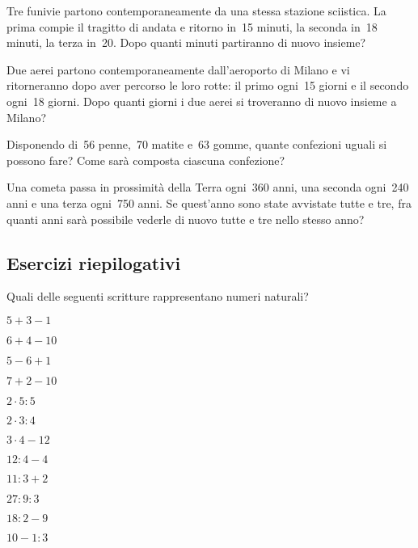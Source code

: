 \begin{htmulticols}{2}
\begin{esercizio}
Tre funivie partono contemporaneamente da una stessa stazione sciistica. La 
prima compie il tragitto di andata e ritorno in~15 minuti, la seconda in~18 
minuti, la terza in~20. 
Dopo quanti minuti partiranno di nuovo insieme? 
\end{esercizio}

\begin{esercizio}
Due aerei partono contemporaneamente dall'aeroporto di Milano e vi 
ritorneranno dopo aver percorso le loro rotte: il primo ogni~15 giorni e il 
secondo ogni~18 giorni. 
Dopo quanti giorni i due aerei si troveranno di nuovo insieme a Milano? 
\end{esercizio}

\begin{esercizio}
Disponendo di~56 penne,~70 matite e~63 gomme, quante confezioni uguali si 
possono fare? Come sarà composta ciascuna confezione? 
\end{esercizio}

\begin{esercizio}
Una cometa passa in prossimità della Terra ogni~360 anni, una seconda 
ogni~240 anni e una terza ogni~750 anni.
Se quest'anno sono state avvistate tutte e tre, fra quanti anni sarà 
possibile vederle di nuovo tutte e tre nello stesso anno? 
\end{esercizio}
\end{htmulticols}


\subsection{Esercizi riepilogativi}
\begin{esercizio}
Quali delle seguenti scritture rappresentano numeri naturali?
 \begin{htmulticols}{4}
 \begin{enumeratees}
 \item \(5+3-1\)
 \item \(6+4-10\)
 \item \(5-6+1\)
 \item \(7+2-10\)
 \item \(2\cdot5:5\)
 \item \(2\cdot3:4\)
 \item \(3\cdot4-12\)
 \item \(12:4-4\)
 \item \(11:3+2\)
 \item \(27:9:3\)
 \item \(18:2-9\)
 \item \(10-1:3\)
 \end{enumeratees}
 \end{htmulticols}
\end{esercizio}


